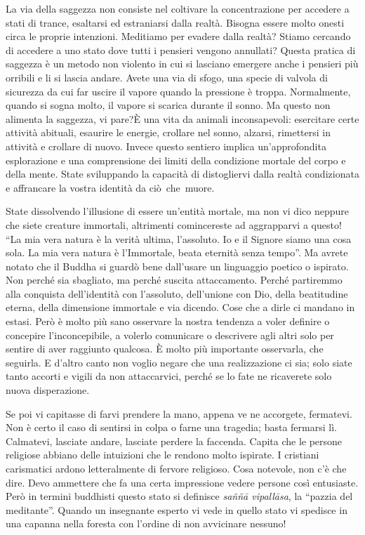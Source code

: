 La via della saggezza non consiste nel coltivare la concentrazione per
accedere a stati di trance, esaltarsi ed estraniarsi dalla realtà.
Bisogna essere molto onesti circa le proprie intenzioni. Meditiamo per
evadere dalla realtà? Stiamo cercando di accedere a uno stato dove tutti
i pensieri vengono annullati? Questa pratica di saggezza è un metodo non
violento in cui si lasciano emergere anche i pensieri più orribili e li
si lascia andare. Avete una via di sfogo, una specie di valvola di
sicurezza da cui far uscire il vapore quando la pressione è troppa.
Normalmente, quando si sogna molto, il vapore si scarica durante il
sonno. Ma questo non alimenta la saggezza, vi pare?È una vita da
animali inconsapevoli: esercitare certe attività abituali, esaurire le
energie, crollare nel sonno, alzarsi, rimettersi in attività e crollare
di nuovo. Invece questo sentiero implica un'approfondita esplorazione e
una comprensione dei limiti della condizione mortale del corpo e della
mente. State sviluppando la capacità di distogliervi dalla realtà
condizionata e affrancare la vostra identità da ciò~che~muore.

State dissolvendo l'illusione di essere un'entità mortale, ma non vi
dico neppure che siete creature immortali, altrimenti comincereste ad
aggrapparvi a questo! ``La mia vera natura è la verità ultima,
l'assoluto. Io e il Signore siamo una cosa sola. La mia vera natura è
l'Immortale, beata eternità senza tempo''. Ma avrete notato che il Buddha
si guardò bene dall'usare un linguaggio poetico o ispirato. Non perché
sia sbagliato, ma perché suscita attaccamento. Perché partiremmo alla
conquista dell'identità con l'assoluto, dell'unione con Dio, della
beatitudine eterna, della dimensione immortale e via dicendo. Cose che a
dirle ci mandano in estasi. Però è molto più sano osservare la nostra
tendenza a voler definire o concepire l'inconcepibile, a volerlo
comunicare o descrivere agli altri solo per sentire di aver raggiunto
qualcosa. È molto più importante osservarla, che seguirla. E d'altro
canto non voglio negare che una realizzazione ci sia; solo siate tanto
accorti e vigili da non attaccarvici, perché se lo fate ne ricaverete
solo nuova disperazione.

Se poi vi capitasse di farvi prendere la mano, appena ve ne accorgete,
fermatevi. Non è certo il caso di sentirsi in colpa o farne una
tragedia; basta fermarsi lì. Calmatevi, lasciate andare, lasciate
perdere la faccenda. Capita che le persone religiose abbiano delle
intuizioni che le rendono molto ispirate. I cristiani carismatici ardono
letteralmente di fervore religioso. Cosa notevole, non c'è che dire.
Devo ammettere che fa una certa impressione vedere persone così
entusiaste. Però in termini buddhisti questo stato si definisce \textit{saññā vipallāsa},
la ``pazzia del meditante''. Quando un insegnante esperto vi
vede in quello stato vi spedisce in una capanna nella foresta con
l'ordine di non avvicinare nessuno!


